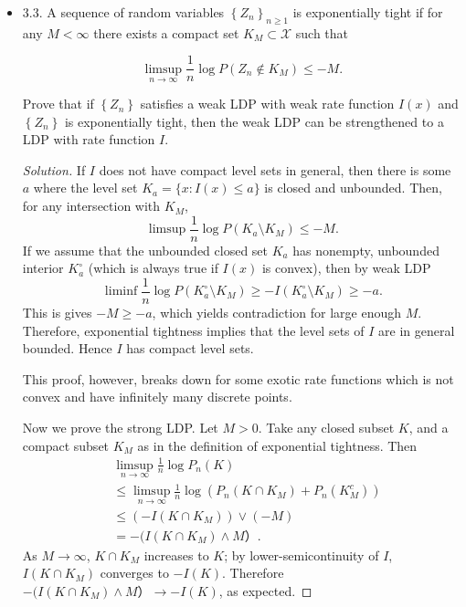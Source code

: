 \begin{itemize}
\begin{proof}[Solution]
	Since $T$ is continuous on $\mathcal{X}$, 
	\[
		T x_n \to  T x = y \qquad \text{along a subsequence}
	.\] 
	This implies $y \in T K_a$, thus $L_a \subset T K_a$.
\end{proof}

\item
	3.3. A sequence of random variables $\left\{Z_n\right\}_{n \geq 1}$ is exponentially tight if for any $M<\infty$ there exists a compact set $K_M \subset \mathcal{X}$ such that

\[
\limsup _{n \rightarrow \infty} \frac{1}{n} \log P\left(Z_n \notin K_M\right) \leq-M .
\]


Prove that if $\left\{Z_n\right\}$ satisfies a weak LDP with weak rate function $I(x)$ and $\left\{Z_n\right\}$ is exponentially tight, then the weak LDP can be strengthened to a LDP with rate function $I$.
\begin{proof}[Solution]
	If $I$ does not have compact level sets in general, then there is some $a$ where the level set $K_a = \{x: I(x) \le a\} $ is closed and unbounded. Then, for any intersection with $K_M$,
	 \[
		\limsup \frac{1}{n} \log P(K_a \setminus K_M) \le  -M
	.\] 
	If we assume that the unbounded closed set $K_a$ has nonempty, unbounded interior $K_a^\circ$ (which is always true if  $I(x)$ is convex), then by weak LDP
	\[
		\liminf \frac{1}{n} \log P(K_a^\circ \setminus  K_M) \ge - I\left( K_a^\circ \setminus K_M \right) \ge - a
	.\] 
	This is gives $- M \ge  - a$, which yields contradiction for large enough $M$. Therefore, exponential tightness implies that the level sets of $I$ are in general bounded. Hence $I$ has compact level sets.

	This proof, however, breaks down for some exotic rate functions which is not convex and have infinitely many discrete points.

	Now we prove the strong LDP. Let $M > 0$. Take any closed subset $K$, and a compact subset $K_M$ as in the definition of exponential tightness. Then
	\begin{align*}
		&\limsup_{n \to \infty } \frac{1}{n} \log P_n\left( K \right) \\
		&\le \limsup_{n \to \infty } \frac{1}{n} \log \left(P_n\left( K \cap K_M \right) + P_n\left( K_M^c \right)  \right)\\
		&\leq (- I(K \cap K_M)) \vee (- M) \\
		&= - (I(K \cap K_M) \wedge M）
	.\end{align*}
	As $M \to \infty $, $K \cap K_M$ increases to $K $; by lower-semicontinuity of $I$, $I(K \cap K_M)$ converges to $- I(K)$. Therefore $- (I(K \cap K_M) \wedge M）\to  - I(K)$, as expected.
\end{proof}


		
\end{itemize}
